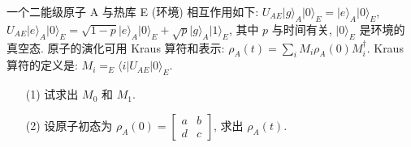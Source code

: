 \documentclass{assignment}
\begin{document}
\begin{prob}
    一个二能级原子 A 与热库 E (环境) 相互作用如下: $U_{AE}\lvert g\rangle_A\lvert 0\rangle_E=\lvert e\rangle_A\lvert 0\rangle_E$, $U_{AE}\lvert e\rangle_A\lvert 0\rangle_E=\sqrt{1-p}\lvert e\rangle_A\lvert 0\rangle_E+\sqrt{p}\lvert g\rangle_A\lvert 1\rangle_E$, 其中 $p$ 与时间有关, $\lvert 0\rangle_E$ 是环境的真空态. 原子的演化可用 Kraus 算符和表示: $\rho_A(t)=\sum_iM_i\rho_A(0)M_i^{\dagger}$. Kraus 算符的定义是: $M_i=_E\langle i\rvert U_{AE}\lvert 0\rangle_E$.
    \begin{itemize}
        \item[(1)] 试求出 $M_0$ 和 $M_1$.
        \item[(2)] 设原子初态为 $\rho_A(0)=\begin{bmatrix}
            a&b\\
            d&c
        \end{bmatrix}$, 求出 $\rho_A(t)$.
    \end{itemize}
\end{prob}
\end{document}
